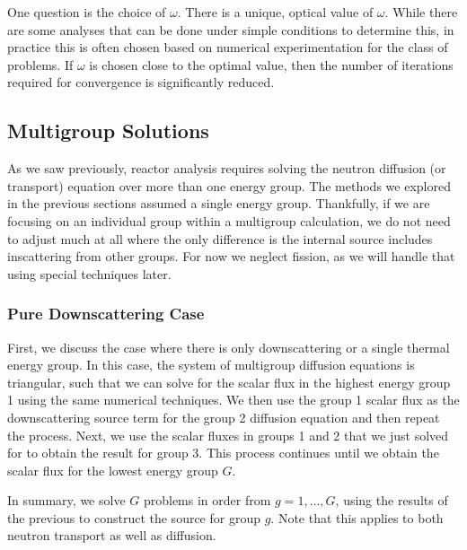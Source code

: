 One question is the choice of $\omega$. There is a unique, optical value of $\omega$. While there are some analyses that can be done under simple conditions to determine this, in practice this is often chosen based on numerical experimentation for the class of problems. If $\omega$ is chosen close to the optimal value, then the number of iterations required for convergence is significantly reduced.




 
\subsection{Multigroup Solutions}

As we saw previously, reactor analysis requires solving the neutron diffusion (or transport) equation over more than one energy group. The methods we explored in the previous sections assumed a single energy group. Thankfully, if we are focusing on an individual group within a multigroup calculation, we do not need to adjust much at all where the only difference is the internal source includes inscattering from other groups. For now we neglect fission, as we will handle that using special techniques later.

\subsubsection{Pure Downscattering Case}

First, we discuss the case where there is only downscattering or a single thermal energy group. In this case, the system of multigroup diffusion equations is triangular, such that we can solve for the scalar flux in the highest energy group 1 using the same numerical techniques. We then use the group 1 scalar flux as the downscattering source term for the group 2 diffusion equation and then repeat the process. Next, we use the scalar fluxes in groups 1 and 2 that we just solved for to obtain the result for group 3. This process continues until we obtain the scalar flux for the lowest energy group $G$. 

In summary, we solve $G$ problems in order from $g = 1, \ldots, G$, using the results of the previous to construct the source for group $g$. Note that this applies to both neutron transport as well as diffusion.

